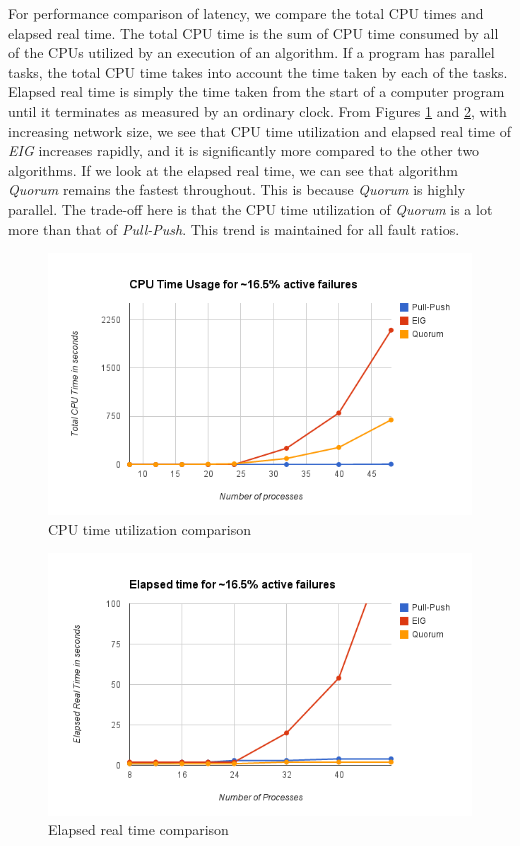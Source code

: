 For performance comparison of latency, we compare the total CPU times and
elapsed real time.  The total CPU time is the sum of CPU time consumed by all
of the CPUs utilized by an execution of an algorithm. If a program has parallel
tasks, the total CPU time takes into account the time taken by each of the
tasks. Elapsed real time is simply the time taken from the start of a computer
program until it terminates as measured by an ordinary clock. From Figures
\ref{fig:cpu} and \ref{fig:elapsed}, with increasing network size, we see that
CPU time utilization and elapsed real time of \textit{EIG} increases rapidly,
and it is significantly more compared to the other two algorithms. If we look
at the elapsed real time, we can see that algorithm \textit{Quorum} remains the
fastest throughout. This is because \textit{Quorum} is highly parallel. The
trade-off here is that the CPU time utilization of \textit{Quorum} is a lot
more than that of \textit{Pull-Push}. This trend is maintained for all fault
ratios.

\begin{figure}[ht] \centering \includegraphics[scale=0.4]{cpu16}
    \caption{CPU time utilization comparison} \label{fig:cpu}
    \end{figure}

\begin{figure}[ht] \centering 
    \includegraphics[scale=0.4]{elapsed16} \caption{Elapsed real time
    comparison} \label{fig:elapsed} \end{figure}

